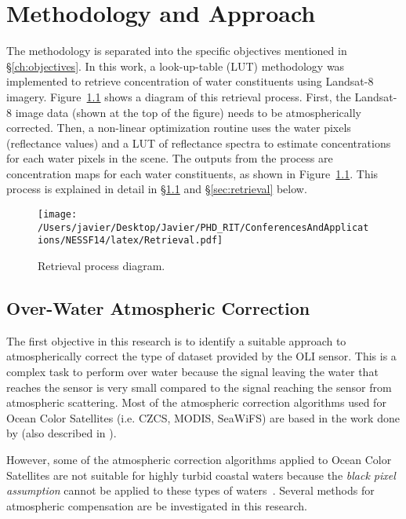 \chapter{Methodology and Approach}
\label{ch:method}

The methodology is separated into the specific objectives mentioned in \S\ref{ch:objectives}. In this work, a look-up-table (LUT) methodology was implemented to retrieve concentration of water constituents using Landsat-8 imagery. Figure~\ref{fig:retrieval} shows a diagram of this retrieval process. First, the Landsat-8 image data (shown at the top of the figure) needs to be atmospherically corrected. Then, a non-linear optimization routine uses the water pixels (reflectance values) and a LUT of reflectance spectra to estimate concentrations for each water pixels in the scene. The outputs from the process are concentration maps for each water constituents, as shown in Figure~\ref{fig:retrieval}. This process is explained in detail in \S\ref{sec:atmcorr} and \S\ref{sec:retrieval} below.
\begin{figure}[htb]
  \centering
  \texttt{[image: /Users/javier/Desktop/Javier/PHD\_RIT/ConferencesAndApplications/NESSF14/latex/Retrieval.pdf]}
  \caption{Retrieval process diagram. \label{fig:retrieval} } 
\end{figure}

\section{Over-Water Atmospheric Correction} 
\label{sec:atmcorr}
The first objective in this research is to identify a suitable approach to atmospherically correct the type of dataset provided by the OLI sensor. This is a complex task to perform over water because the signal leaving the water that reaches the sensor is very small compared to the signal reaching the sensor from atmospheric scattering. Most of the atmospheric correction algorithms used for Ocean Color Satellites (i.e. CZCS, MODIS, SeaWiFS) are based in the work done by \cite{Gordon:1994} (also described in \cite{Gordon:1997}).

However, some of the atmospheric correction algorithms applied to Ocean Color Satellites are not suitable for highly turbid coastal waters because the {\it black pixel assumption} cannot be applied to these types of waters~\cite{Patt2003}. Several methods for atmospheric compensation are be investigated in this research.

